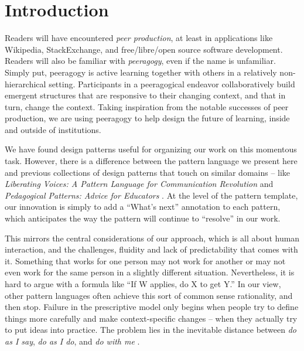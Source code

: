 
\section*{Introduction}\label{sec:Introduction}

Readers will have encountered \emph{peer production}, at least in applications like Wikipedia, StackExchange, and free/libre/open source software development.   
%
Readers will also be familiar with \emph{peeragogy}, even if the name is unfamiliar.  Simply put, peeragogy is active learning together with others in a relatively non-hierarchical setting.  Participants in a peeragogical endeavor collaboratively build emergent structures that are responsive to their changing context, and that in turn, change the context.
% 
Taking inspiration from the notable successes of peer production, we are using peeragogy to help design the future of learning, inside and outside of institutions.

We have found design patterns useful for organizing our work on this momentous task.  However, there is a difference between the pattern language we present here and previous collections of design patterns that touch on similar domains -- like \emph{Liberating Voices: A Pattern Language for Communication Revolution} \cite{schuler2008liberating} and \emph{Pedagogical Patterns: Advice for Educators} \cite{bergin2012pedagogical}.  At the level of the pattern template, our innovation is simply to add a ``What's next'' annotation to each pattern, which anticipates the way the pattern will continue to ``resolve'' in our work. 


This mirrors the central considerations of our approach, which is all about human interaction, and the challenges, fluidity and lack of predictability that comes with it.  Something that works for one person may not work for another or may not even work for the same person in a slightly different situation.  Nevertheless, it is hard to argue with a formula like ``If W applies, do X to get Y.'' In our view, other pattern languages often achieve this sort of common sense rationality, and then stop.  Failure in the prescriptive model only begins when people try to define things more carefully and make context-specific changes -- when they actually try to put ideas into practice.  The problem lies in the inevitable distance between \emph{do as I say}, \emph{do as I do}, and \emph{do with me} \cite[p.~26]{deleuze1994difference}.

